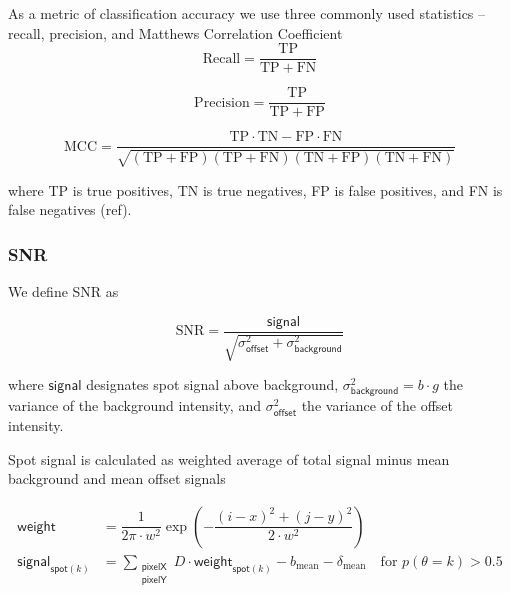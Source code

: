 As a metric of classification accuracy we use three commonly used statistics -- recall, precision, and Matthews Correlation Coefficient \cite{Matthews1975-rw}
\begin{equation}
    \mathrm{Recall} = \dfrac{\mathrm{TP}}{\mathrm{TP} + \mathrm{FN}}
\end{equation}

\begin{equation}
    \mathrm{Precision} = \dfrac{\mathrm{TP}}{\mathrm{TP} + \mathrm{FP}}
\end{equation}

\begin{equation}
    \mathrm{MCC} =
        \dfrac{\mathrm{TP} \cdot \mathrm{TN} - \mathrm{FP} \cdot \mathrm{FN}}
        {\sqrt{(\mathrm{TP} + \mathrm{FP}) (\mathrm{TP} + \mathrm{FN}) (\mathrm{TN} + \mathrm{FP}) (\mathrm{TN} + \mathrm{FN})}}
\end{equation}

\noindent
where TP is true positives, TN is true negatives, FP is false positives, and FN is false negatives (ref).

\subsubsection*{SNR}

We define SNR as

\begin{equation}
    \mathrm{SNR} = \dfrac{\mathsf{signal}}{\sqrt{\sigma^2_{\mathsf{offset}} + \sigma^2_{\mathsf{background}}}}
\end{equation}

where $\mathsf{signal}$ designates spot signal above background, $\sigma^2_{\mathsf{background}} = b \cdot g$ the variance of the background intensity, and $\sigma^2_{\mathsf{offset}}$ the variance of the offset intensity.

Spot signal is calculated as weighted average of total signal minus mean background and mean offset signals

\begin{subequations}
\begin{align}
    \mathsf{weight} &= \dfrac{1}{2 \pi \cdot w^2} \exp{\left( -\dfrac{(i-x)^2 + (j-y)^2}{2 \cdot w^2} \right)} \\
    \mathsf{signal}_{\mathsf{spot}(k)} &=  \sum_{\substack{\mathsf{pixelX} \\ \mathsf{pixelY}}} D \cdot \mathsf{weight}_{\mathsf{spot}(k)} - b_{\mathrm{mean}} - \delta_\mathrm{mean} \quad \textrm{for } p(\theta = k) > 0.5
\end{align}
\end{subequations}

